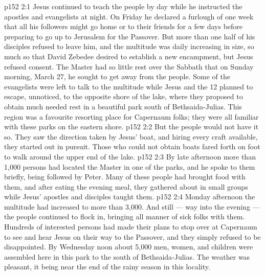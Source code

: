 \vs p152 2:1 Jesus continued to teach the people by day while he instructed the apostles and evangelists at night. On Friday he declared a furlough of one week that all his followers might go home or to their friends for a few days before preparing to go up to Jerusalem for the Passover. But more than one half of his disciples refused to leave him, and the multitude was daily increasing in size, so much so that David Zebedee desired to establish a new encampment, but Jesus refused consent. The Master had so little rest over the Sabbath that on Sunday morning, March 27, he sought to get away from the people. Some of the evangelists were left to talk to the multitude while Jesus and the 12 planned to escape, unnoticed, to the opposite shore of the lake, where they proposed to obtain much needed rest in a beautiful park south of Bethsaida\hyp{}Julias. This region was a favourite resorting place for Capernaum folks; they were all familiar with these parks on the eastern shore.
\vs p152 2:2 But the people would not have it so. They saw the direction taken by Jesus’ boat, and hiring every craft available, they started out in pursuit. Those who could not obtain boats fared forth on foot to walk around the upper end of the lake.
\vs p152 2:3 By late afternoon more than 1,000 persons had located the Master in one of the parks, and he spoke to them briefly, being followed by Peter. Many of these people had brought food with them, and after eating the evening meal, they gathered about in small groups while Jesus’ apostles and disciples taught them.
\vs p152 2:4 Monday afternoon the multitude had increased to more than 3,000. And still --- way into the evening --- the people continued to flock in, bringing all manner of sick folks with them. Hundreds of interested persons had made their plans to stop over at Capernaum to see and hear Jesus on their way to the Passover, and they simply refused to be disappointed. By Wednesday noon about 5,000 men, women, and children were assembled here in this park to the south of Bethsaida\hyp{}Julias. The weather was pleasant, it being near the end of the rainy season in this locality.

